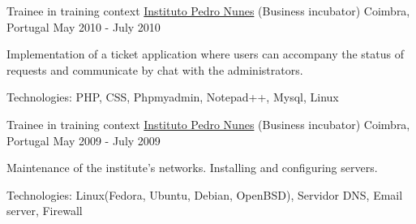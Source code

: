 \begin{cventries}

\cventry
{Trainee in training context} %
{\href{https://www.ipn.pt/}{Instituto Pedro Nunes} (Business incubator)} %
{Coimbra, Portugal} %
{May 2010 - July 2010} %
{ %
\begin{cvitems}
\item {Implementation of a ticket application where users can accompany the status of requests and communicate by chat with the administrators.}
\item{Technologies: PHP, CSS, Phpmyadmin, Notepad++, Mysql, Linux }
\end{cvitems}
}


\cventry
{Trainee in training context} %
{\href{https://www.ipn.pt/}{Instituto Pedro Nunes} (Business incubator)} %
{Coimbra, Portugal} %
{May 2009 - July 2009} %
{ %
\begin{cvitems}
\item {Maintenance of the institute's networks. Installing and configuring servers.}
\item{Technologies: Linux(Fedora, Ubuntu, Debian, OpenBSD), Servidor DNS, Email server, Firewall}
\end{cvitems}
}




\end{cventries}
